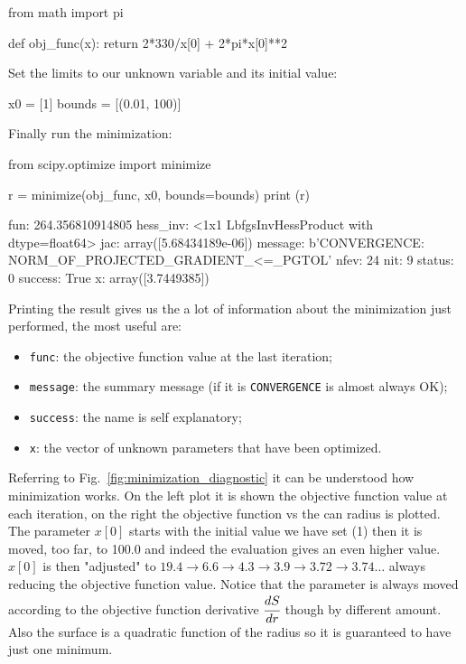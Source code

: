 \begin{ipython}
from math import pi

def obj_func(x):
    return 2*330/x[0] + 2*pi*x[0]**2
\end{ipython}

Set the limits to our unknown variable and its initial value:

\begin{ipython}
x0 = [1]
bounds = [(0.01, 100)]
\end{ipython}

Finally run the minimization:

\begin{ipython}
from scipy.optimize import minimize

r = minimize(obj_func, x0, bounds=bounds)
print (r)
\end{ipython}
\begin{ioutput}
      fun: 264.356810914805
 hess_inv: <1x1 LbfgsInvHessProduct with dtype=float64>
      jac: array([5.68434189e-06])
  message: b'CONVERGENCE: NORM_OF_PROJECTED_GRADIENT_<=_PGTOL'
     nfev: 24
      nit: 9
   status: 0
  success: True
        x: array([3.7449385])
\end{ioutput}

Printing the result gives us the a lot of information about the minimization just performed, the most useful are:
\begin{itemize}
\item \texttt{func}: the objective function value at the last iteration;
\item \texttt{message}: the summary message (if it is \texttt{CONVERGENCE} is almost always OK);
\item \texttt{success}: the name is self explanatory;
\item \texttt{x}: the vector of unknown parameters that have been optimized.
\end{itemize}

Referring to Fig.~\ref{fig:minimization_diagnostic} it can be understood how minimization works. On the left plot it is shown the objective function value at each iteration, on the right the objective function vs the can radius is plotted.
The parameter $x[0]$ starts with the initial value we have set (1) then it is moved, too far, to 100.0 and indeed the evaluation gives an even higher value. $x[0]$ is then "adjusted" to $19.4\rightarrow 6.6\rightarrow 4.3\rightarrow 3.9\rightarrow 3.72\rightarrow 3.74\ldots$ always reducing the objective function value. Notice that the parameter is always moved according to the objective function derivative $\cfrac{dS}{dr}$ though by different amount.
Also the surface is a quadratic function of the radius so it is guaranteed to have just one minimum.

